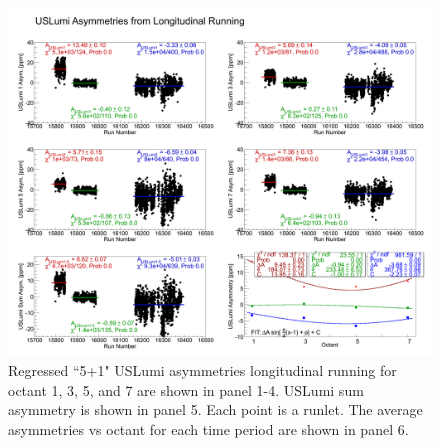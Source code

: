 \begin{figure}[!h]
	\begin{center}
	\includegraphics[width=15.0cm]{figures/USLumiSumAsymLongitudinal}
	\end{center}
	\caption
	{Regressed ``5+1" USLumi asymmetries longitudinal running for octant 1, 3, 5, and 7 are shown in panel 1-4. USLumi sum asymmetry is shown in panel 5. Each point is a runlet. The average asymmetries vs octant for each time period are shown in panel 6.}
	\label{fig:USLumiSumAsymLongitudinal}
\end{figure}
